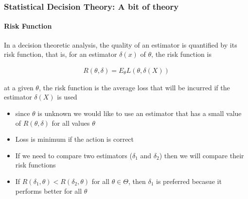 \documentclass[
  shownotes,
  xcolor={svgnames},
  hyperref={colorlinks,citecolor=DarkBlue,linkcolor=DarkRed,urlcolor=DarkBlue}
  ]{beamer}
\begin{document}
\begin{frame}
\frametitle{Statistical Decision Theory: A bit of theory}
\framesubtitle{Risk Function}
In a decision theoretic analysis, the quality of an estimator is quantified by its risk function, that is, for an estimator $\delta(x)$ of $\theta$, the risk function is 

\begin{align}
      R(\theta,\delta)=E_\theta L(\theta,\delta(X))
    \end{align}

    at a given $\theta$, the risk function is the average loss that will be incurred if the estimator $\delta(X)$ is used


\begin{itemize}
\item since $\theta$ is unknown we would like to use an estimator that has a small value of $R(\theta,\delta)$ for all values $\theta$
\item Loss is minimum if the action is correct
\item If we need to compare two estimators ($\delta_1$ and $\delta_2$) then we will compare their risk functions
\item If $R(\delta_1,\theta)<R(\delta_2,\theta)$ for all $\theta \in \Theta$, then $\delta_1$ is preferred becasue it performs better for all $\theta$

\end{itemize}

\end{frame}
\end{document}
